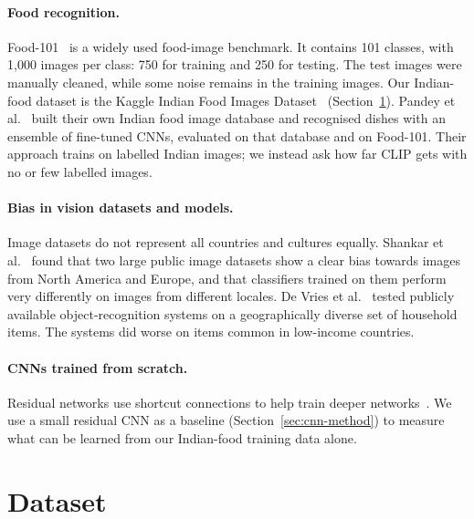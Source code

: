 \documentclass[twoside,a4paper,11pt]{article}
\begin{document}
\paragraph{Food recognition.} Food-101~\cite{bossard2014food101} is a widely used food-image benchmark. It contains 101 classes, with 1,000 images per class: 750 for training and 250 for testing. The test images were manually cleaned, while some noise remains in the training images. Our Indian-food dataset is the Kaggle Indian Food Images Dataset~\cite{banerjee2022indianfood} (Section~\ref{sec:dataset}). Pandey et al.~\cite{pandey2017foodnet} built their own Indian food image database and recognised dishes with an ensemble of fine-tuned CNNs, evaluated on that database and on Food-101. Their approach trains on labelled Indian images; we instead ask how far CLIP gets with no or few labelled images.

\paragraph{Bias in vision datasets and models.} Image datasets do not represent all countries and cultures equally. Shankar et al.~\cite{shankar2017geodiversity} found that two large public image datasets show a clear bias towards images from North America and Europe, and that classifiers trained on them perform very differently on images from different locales. De Vries et al.~\cite{devries2019everyone} tested publicly available object-recognition systems on a geographically diverse set of household items. The systems did worse on items common in low-income countries.
\paragraph{CNNs trained from scratch.} Residual networks use shortcut connections to help train deeper networks~\cite{he2016resnet}. We use a small residual CNN as a baseline (Section~\ref{sec:cnn-method}) to measure what can be learned from our Indian-food training data alone.
\section{Dataset}\label{sec:dataset}
\end{document}
